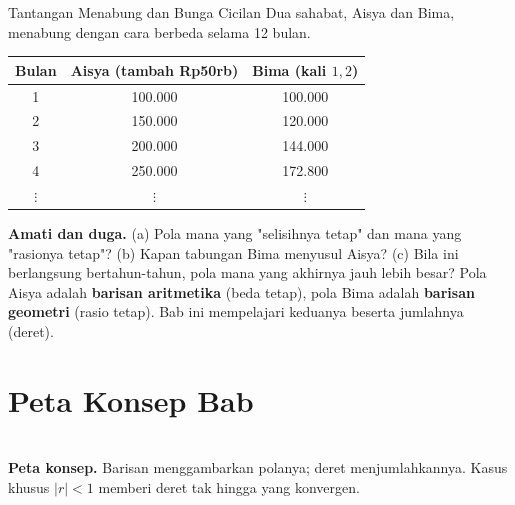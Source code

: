 \documentclass[11pt,a4paper]{report}
\theoremstyle{gaya}
\begin{document}
\begin{studikasus}{Tantangan Menabung dan Bunga Cicilan}
Dua sahabat, Aisya dan Bima, menabung dengan cara berbeda selama 12 bulan.
\begin{center}
\begin{tabular}{c|c|c}
\toprule
Bulan & Aisya (tambah Rp50rb) & Bima (kali $1{,}2$) \\
\midrule
1 & 100.000 & 100.000 \\
2 & 150.000 & 120.000 \\
3 & 200.000 & 144.000 \\
4 & 250.000 & 172.800 \\
$\vdots$ & $\vdots$ & $\vdots$ \\
\bottomrule
\end{tabular}
\end{center}
\textbf{Amati dan duga.} (a) Pola mana yang "selisihnya tetap" dan mana yang "rasionya tetap"? (b) Kapan tabungan Bima menyusul Aisya? (c) Bila ini berlangsung bertahun-tahun, pola mana yang akhirnya jauh lebih besar? Pola Aisya adalah \textbf{barisan aritmetika} (beda tetap), pola Bima adalah \textbf{barisan geometri} (rasio tetap). Bab ini mempelajari keduanya beserta jumlahnya (deret).
\end{studikasus}

\section*{Peta Konsep Bab}
\begin{center}
\\
\small \textbf{Peta konsep.} Barisan menggambarkan polanya; deret menjumlahkannya. Kasus khusus $|r|<1$ memberi deret tak hingga yang konvergen.
\end{center}
\end{document}
